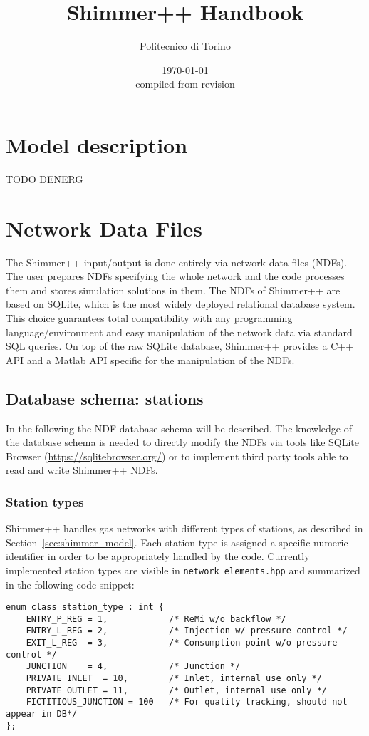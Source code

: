 \documentclass[10pt]{article}
\title{Shimmer++ Handbook}
\author{Politecnico di Torino}
\date{\today\\{\footnotesize compiled from revision \texttt{\gitrevision}}}
\begin{document}
\maketitle
\tableofcontents

\section{Model description}
TODO DENERG

\section{Network Data Files}
The Shimmer++ input/output is done entirely via network data files (NDFs). The
user prepares NDFs specifying the whole network and the code processes them and
stores simulation solutions in them.
The NDFs of Shimmer++ are based on SQLite, which is the
most widely deployed relational database system. This choice guarantees total
compatibility with any programming language/environment and easy manipulation of
the network data via standard SQL queries. On top of the raw SQLite database, Shimmer++ provides a C++
API and a Matlab API specific for the manipulation of the NDFs.

\subsection{Database schema: stations}
In the following the NDF database schema will be described. The knowledge of
the database schema is needed to directly modify the NDFs via tools like
SQLite Browser (\url{https://sqlitebrowser.org/}) or to implement third party
tools able to read and write Shimmer++ NDFs.

\subsubsection{Station types}
Shimmer++ handles gas networks with different types of stations, as described
in Section~\ref{sec:shimmer_model}. Each station type is assigned a specific
numeric identifier in order to be appropriately handled by the code. Currently
implemented station types are visible in \texttt{network\_elements.hpp} and
summarized in the following code snippet: 

\begin{verbatim}
enum class station_type : int {
    ENTRY_P_REG = 1,            /* ReMi w/o backflow */
    ENTRY_L_REG = 2,            /* Injection w/ pressure control */
    EXIT_L_REG  = 3,            /* Consumption point w/o pressure control */
    JUNCTION    = 4,            /* Junction */
    PRIVATE_INLET  = 10,        /* Inlet, internal use only */
    PRIVATE_OUTLET = 11,        /* Outlet, internal use only */
    FICTITIOUS_JUNCTION = 100   /* For quality tracking, should not appear in DB*/
};
\end{verbatim}
\end{document}
